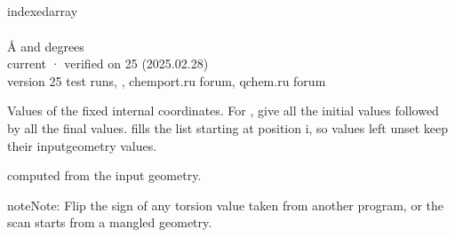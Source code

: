 \documentclass[letterpaper,10pt,english,openany,oneside]{sphinxmanual}
\begin{document}
\subsection{}
\label{\detokenize{reference/optimize:value}}\label{\detokenize{reference/optimize:optimize-value}}
\ignorespaces 
\sphinxAtStartPar
{} indexed\sphinxhyphen{}array\\
 \\
 Å and degrees\\
 current · verified on 25 (2025.02.28)\\
 version 25 test runs, , chemport.ru forum, qchem.ru forum

\sphinxAtStartPar
Values of the fixed internal coordinates. For , give all the initial values followed by all the
final values.  fills the list starting at position i, so values left unset keep their input\sphinxhyphen{}geometry
values.

\sphinxAtStartPar
{} computed from the input geometry.

\begin{sphinxadmonition}{note}{Note:}
\sphinxAtStartPar
{} Flip
the sign of any torsion value taken from another program, or the scan starts from a mangled geometry.
\end{sphinxadmonition}

\sphinxAtStartPar
{}

\begin{sphinxVerbatim}[commandchars=\\\{\}]
\end{sphinxVerbatim}
\end{document}
